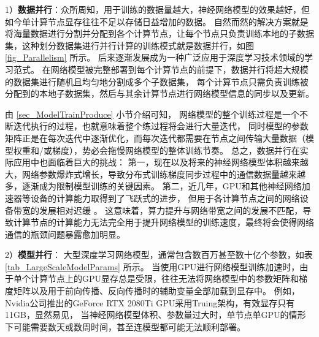 \documentclass{xdupgthesis}
\begin{document}
1）\textbf{数据并行}：众所周知，用于训练的数据量越大，神经网络模型的效果越好，但如今单计算节点显存往往不足以存储日益增加的数据。
自然而然的解决方案就是将海量数据进行分割并分配到各个计算节点，让每个节点只负责训练本地的子数据集，这种划分数据集进行并行计算的训练模式就是数据并行，如图 \ref{fig_Parallelism}  所示。
后来逐渐发展成为一种广泛应用于深度学习技术领域的学习范式。
在网络模型被完整部署到每个计算节点的前提下，数据并行将超大规模的数据集进行随机且均匀地分割成多个子数据集，
每个计算节点只需负责训练被分配到的本地子数据集，然后与其余计算节点进行网络模型信息的同步以及更新。

由 \ref{sec_ModelTrainProduce} 小节介绍可知，
网络模型的整个训练过程是一个不断迭代执行的过程，也就意味着整个练过程将会进行大量迭代，
同时模型的参数矩阵正是在每次迭代中逐渐优化，而每次迭代都需要在节点之间传输大量数据（模型权重和/或梯度），势必会拖慢网络模型的整体训练节奏。
总之，数据并行在实际应用中也面临着巨大的挑战：
第一，现在以及将来的神经网络模型体积越来越大，网络参数爆炸式增长，导致分布式训练梯度同步过程中的通信数据量越来越多，逐渐成为限制模型训练的关键因素。
第二，近几年，GPU和其他神经网络加速器等设备的计算能力取得到了飞跃式的进步，
但用于各计算节点之间的网络设备带宽的发展相对迟缓 \cite{gholami2021ai}。
这意味着，算力提升与网络带宽之间的发展不匹配，导致计算节点的计算能力无法完全用于提升网络模型的训练速度，最终将会使得网络通信的瓶颈问题暴露愈加明显。

2）\textbf{模型并行}：
大型深度学习网络模型，通常包含数百万甚至数十亿个参数，如表 \ref{tab_LargeScaleModelParams} 所示。
当使用GPU进行网络模型训练加速时，由于单个计算节点上的GPU显存总是受限，往往无法将网络模型中的参数矩阵和梯度矩阵以及用于前向传播、反向传播时的辅助变量全部加载到显存中。
例如，Nvidia公司推出的GeForce RTX 2080Ti GPU采用Truing架构，有效显存只有11GB，显然易见，
当神经网络模型体积、参数量过大时，单节点单GPU的情形下可能需要数天或数周时间，甚至连模型都可能无法顺利部署。

\renewcommand{\arraystretch}{1.3}
\begin{table}[ht]
    \centering
    \caption{常见大规模深度学习网络模型参数}
    \label{tab_LargeScaleModelParams}
\end{table}
\end{document}
